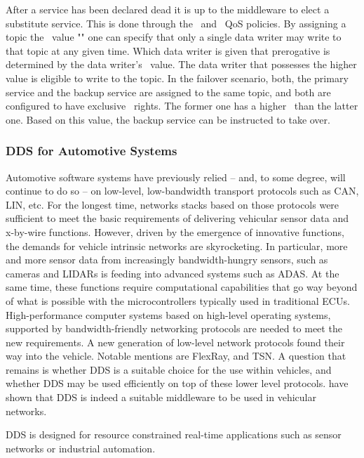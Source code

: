 After a service has been declared dead it is up to the middleware to elect a substitute service. This is done through the \ownership\ and \ostrength\ QoS policies. By assigning a topic the \ownership\ value "" one can specify that only a single data writer may write to that topic at any given time. Which data writer is given that prerogative is determined by the data writer's \ostrength\ value. The data writer that possesses the higher value is eligible to write to the topic. In the failover scenario, both, the primary service and the backup service are assigned to the same topic, and both are configured to have exclusive \ownership\ rights. The former one has a higher \ostrength\ than the latter one. Based on this value, the backup service can be instructed to take over.


\subsubsection{DDS for Automotive Systems}
Automotive software systems have previously relied -- and, to some degree, will continue to do so -- on low-level, low-bandwidth transport protocols such as CAN, LIN, etc. For the longest time, networks stacks based on those protocols were sufficient to meet the basic requirements of delivering vehicular sensor data and x-by-wire functions. However, driven by the emergence of innovative functions, the demands for vehicle intrinsic networks are skyrocketing. In particular, more and more sensor data from increasingly bandwidth-hungry sensors, such as cameras and LIDARs is feeding into advanced systems such as ADAS. At the same time, these functions require computational capabilities that go way beyond of what is possible with the microcontrollers typically used in traditional ECUs. High-performance computer systems based on high-level operating systems, supported by bandwidth-friendly networking protocols are needed to meet the new requirements. A new generation of low-level network protocols found their way into the vehicle. Notable mentions are FlexRay, and TSN. A question that remains is whether DDS is a suitable choice for the use within vehicles, and whether DDS may be used efficiently on top of these lower level protocols. \citeauthor*{bouhouch2013dds} have shown \cite{bouhouch2013dds} that DDS is indeed a suitable middleware to be used in vehicular networks.


DDS is designed for resource constrained real-time applications such as sensor networks or industrial automation.

